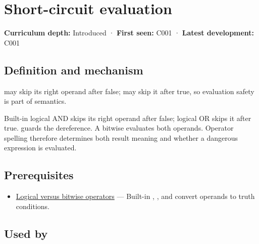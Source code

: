 \hypertarget{appendix-2e245a6fa8d3}{}\label{referencestart:appendix-2e245a6fa8d3}
\section{Short-circuit evaluation}\label{appendix-2e245a6fa8d3-short-circuit-evaluation}

\hypertarget{appendix-2e245a6fa8d3-short-circuit-evaluation}{}

\textbf{Curriculum depth:} Introduced · \textbf{First seen:} C001 · \textbf{Latest development:} C001

\begin{allmightroledefinition}

\subsection{Definition and mechanism}\label{appendix-2e245a6fa8d3-definition-and-mechanism}

\hypertarget{appendix-2e245a6fa8d3-definition-and-mechanism}{}

\BookInlineCode{\&\&} may skip its right operand after false; \BookInlineCode{\textbar\textbar{}} may skip it after true, so evaluation safety is part of semantics.

\end{allmightroledefinition}

Built-in logical AND skips its right operand after false; logical OR skips it after true.  guards the dereference. A bitwise \BookInlineCode{\&} evaluates both operands. Operator spelling therefore determines both result meaning and whether a dangerous expression is evaluated.

\subsection{Prerequisites}\label{appendix-2e245a6fa8d3-prerequisites}

\hypertarget{appendix-2e245a6fa8d3-prerequisites}{}

\begin{itemize}
\tightlist
\item
  \hyperref[appendix-fe6b457d68d8]{Logical versus bitwise operators} --- Built-in \BookInlineCode{\&\&}, \BookInlineCode{\textbar\textbar{}}, and \BookInlineCode{!} convert operands to truth conditions.
\end{itemize}

\subsection{Used by}\label{appendix-2e245a6fa8d3-used-by}

